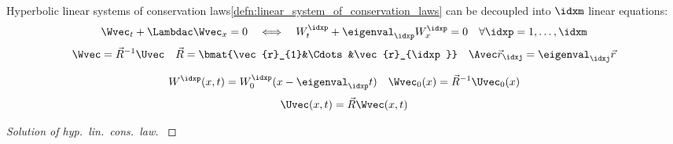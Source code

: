 \begin{propositionbox}\nospacing
    \begin{proposition} \label{proposition:decoupled_hyperbolic_lin_cons_law}\leavevmode\\
        Hyperbolic linear systems of conservation laws\cref{defn:linear_system_of_conservation_laws} can be decoupled into $\idxm$
        linear equations:
        \begin{align*}
          \Wvec_{t}+\Lambdac\Wvec_{x}=0&&\iff&&W_{t}^{\idxp}+\eigenval_{\idxp}W_{x}^{\idxp}=0\quad\forall\idxp=1,\ldots,\idxm
        \end{align*}
        \begin{align}
          \Wvec=\vec{R}^{-1}\Uvec&&\vec{R}=\bmat{\vec{r}_{1}&\Cdots&\vec{r}_{\idxp}}&&\Avec\vec{r}_{\idxj}=\eigenval_{\idxj}\vec{r}\label{eq:decoupled_hyperbolic_conservation_law}
        \end{align}
    \end{proposition}
\end{propositionbox}
\begin{corbox}\nospacing
    \begin{cor}\label{cor:solution_of_hyp_lin_cons_laws}
        \begin{align}
          W^{\idxp}(x,t)=W_{0}^{\idxp}(x-\eigenval_{\idxp}t)&&\Wvec_{0}(x)=\vec{R}^{-1}\Uvec_{0}(x)
        \end{align}
        \begin{align}
          \Uvec(x,t)=\vec{R}\Wvec(x,t)
        \end{align}
    \end{cor}
\end{corbox}
\begin{proofbox}\nospacing
    \begin{proof}[Solution of hyp.\ lin.\ cons.\ law]\label{proof:cor:solution_of_hyp_lin_cons_laws}
    \end{proof}
\end{proofbox}
